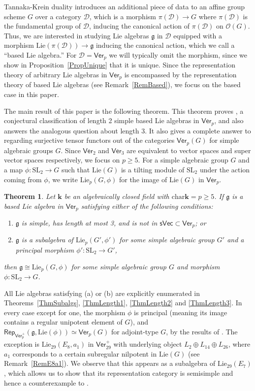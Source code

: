 \documentclass[11pt,a4paper,reqno]{amsart}
\newtheorem{thm}{Theorem}
\theoremstyle{definition}
\newcommand{\bk}{\mathbf{k}}
\newcommand{\cD}{\mathcal{D}}
\numberwithin{equation}{section}
\newcommand{\charr}{\mathrm{char}}
\newcommand{\Ver}{\mathsf{Ver}}
\newcommand{\Rep}{\mathsf{Rep}}
\newcommand{\cO}{\mathcal{O}}
\newcommand{\fg}{\mathfrak{g}}
\newcommand{\Lie}{\mathrm{Lie}}
\newcommand{\sVec}{\mathsf{sVec}}
\newcommand{\SL}{\mathrm{SL}}
\begin{document}
Tannaka-Krein duality introduces an additional piece of data to an affine group scheme $G$ over a category $\cD$, which is a morphism $\pi(\cD)\to G$ where $\pi(\cD)$ is the fundamental group of $\cD$, inducing the canonical action of $\pi(\cD)$ on $\cO(G)$. Thus, we are interested in studying Lie algebras $\fg$ in $\cD$ equipped with a morphism $\Lie(\pi(\cD))\to\fg$ inducing the canonical action, which we call a ``based Lie algebra.'' For $\cD=\Ver_p$ we will typically omit the morphism, since we show in Proposition~\ref{PropUnique} that it is unique. Since the representation theory of arbitrary Lie algebras in $\Ver_p$ is encompassed by the representation theory of based Lie algebras (see Remark~\ref{RemBased}), we focus on the based case in this paper.

The main result of this paper is the following theorem. This theorem proves \cite[Conjecture~4.4]{asymptotic}, a conjectural classification of length 2 simple based Lie algebras in $\Ver_p$, and also answers the analogous question about length 3. It also gives a complete answer to \cite[Question~6.5]{EO} regarding surjective tensor functors out of the categories $\Ver_p(G)$ for simple algebraic groups $G$. Since $\Ver_2$ and $\Ver_3$ are equivalent to vector spaces and super vector spaces respectively, we focus on $p\geq5$. For a simple algebraic group $G$ and a map $\phi:\SL_2\to G$ such that $\Lie(G)$ is a tilting module of $\SL_2$ under the action coming from $\phi$, we write $\Lie_p(G,\phi)$ for the image of $\Lie(G)$ in $\Ver_p$.

\begin{thm}\label{ThmMain}
Let $\bk$ be an algebraically closed field with $\charr\bk=p\geq5$. If $\fg$ is a based Lie algebra in $\Ver_p$ satisfying either of the following conditions:
\begin{enumerate}[label=(\alph*)]
\item $\fg$ is simple, has length at most 3, and is not in $\sVec\subset\Ver_p$; or
\item $\fg$ is a subalgebra of $\Lie_p(G',\phi')$ for some simple algebraic group $G'$ and a principal morphism $\phi':\SL_2\to G'$,
\end{enumerate}
then $\fg\cong\Lie_p(G,\phi)$ for some simple algebraic group $G$ and morphism $\phi:\SL_2\to G$.
\end{thm}

All Lie algebras satisfying (a) or (b) are explicitly enumerated in Theorems~\ref{ThmSubalgs}, \ref{ThmLength1}, \ref{ThmLength2} and \ref{ThmLength3}. In every case except for one, the morphism $\phi$ is principal (meaning its image contains a regular unipotent element of $G$), and $\Rep_{\Ver_p^+}(\fg,\Lie(\phi))\simeq\Ver_p(G)$ for adjoint-type $G$, by the results of \cite[\S3]{CEN}. The exception is $\Lie_{29}(E_8,a_1)$ in $\Ver_{29}^+$ with underlying object $L_2\oplus L_{14}\oplus L_{26}$, where $a_1$ corresponds to a certain subregular nilpotent in $\Lie(G)$ (see Remark~\ref{RemE8a1}). We observe that this appears as a subalgebra of $\Lie_{29}(E_7)$, which allows us to show that its representation category is semisimple and hence a counterexample to \cite[Conjecture~4.1]{asymptotic}.
\end{document}
